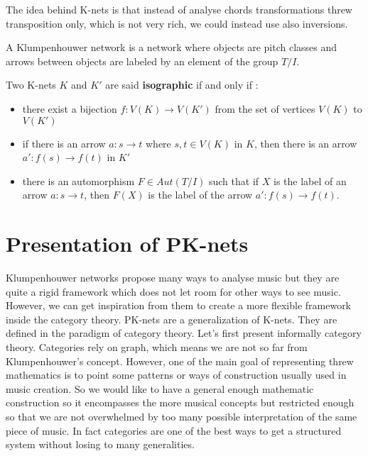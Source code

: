 \documentclass{report}
\begin{document}
The idea behind K-nets is that instead of analyse chords transformations threw transposition only, which is not very rich, we could instead use also inversions.

\begin{defn}
    A Klumpenhouwer network is a network where objects are pitch classes and arrows between objects are labeled by an element of the group $T/I$.
\end{defn}

\begin{defn}
    Two K-nets $K$ and $K'$ are said \textbf{isographic} if and only if :
    \begin{itemize}
        \item there exist a bijection $f:V(K)\rightarrow V(K')$ from the set of vertices $V(K)$ to $V(K')$
        \item if there is an arrow $a:s\rightarrow t$ where $s,t\in V(K)$ in $K$, then there is an arrow $a':f(s)\rightarrow f(t)$ in $K'$
        \item there is an automorphism $F \in Aut(T/I)$ such that if $X$ is the label of an arrow $a:s\rightarrow t$, then $F(X)$ is the label of the arrow $a':f(s)\rightarrow f(t)$.
    \end{itemize}
\end{defn}




\section{Presentation of PK-nets}
Klumpenhouwer networks propose many ways to analyse music but they are quite a rigid framework which does not let room for other ways to see music. However, we can get inspiration from them to create a more flexible framework inside the category theory. PK-nets\cite{PAAE2016} are a generalization of K-nets. They are defined in the paradigm of category theory. Let's first present informally category theory.
Categories rely on graph, which means we are not so far from Klumpenhouwer's concept. However, one of the main goal of representing threw mathematics is to point some patterns or ways of construction usually used in music creation. So we would like to have a general enough mathematic construction so it encompasses the more musical concepts but restricted enough so that we are not overwhelmed by too many possible interpretation of the same piece of music.
In fact categories are one of the best ways to get a structured system without losing to many generalities.
\end{document}
